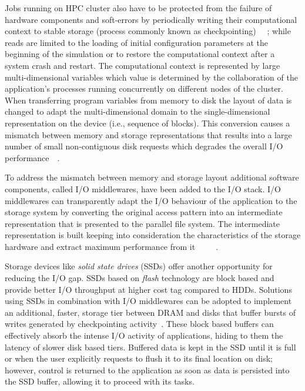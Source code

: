 Jobs running on HPC cluster also have to be protected from the failure of hardware components and soft-errors by periodically writing their computational context to stable storage (process commonly known as checkpointing)
~\cite{Schroeder2006}~\cite{Schroeder2007}; 
while reads are limited to the loading of initial configuration parameters at the beginning of the simulation or to restore the computational context after a system crash and restart. The computational context is 
represented by large multi-dimensional variables which value is determined by the collaboration of the application's processes running concurrently on different nodes of the cluster. When transferring program 
variables from memory to disk the layout of data is changed to adapt the multi-dimensional domain to the single-dimensional representation on the device (i.e., sequence of blocks). This conversion causes a mismatch 
between memory and storage representations that results into a large number of small non-contiguous disk requests which degrades the overall I/O performance~\cite{Nieuwejaar1996}~\cite{Simitci1998}. 

To address the mismatch between memory and storage layout additional software components, called I/O middlewares, have been added to the I/O stack. I/O middlewares can transparently adapt the I/O behaviour of the 
application to the storage system by converting the original access pattern into an intermediate representation that is presented to the parallel file system. The intermediate representation is built keeping into 
consideration the characteristics of the storage hardware and extract maximum performance from it~\cite{ThakurC96}~\cite{Bent2009}~\cite{Moody2010_2}~\cite{Frings2009}~\cite{Lofstead2008}.

Storage devices like \textit{solid state drives} (SSDs) offer another opportunity for reducing the I/O gap. SSDs based on \textit{flash} technology are block based and provide better I/O throughput at higher cost
tag compared to HDDs. Solutions using SSDs in combination with I/O middlewares can be adopted to implement an additional, faster, storage tier between DRAM and disks that buffer bursts of writes generated by
checkpointing activity~\cite{Liu2012}. These block based buffers can effectively absorb the intense I/O activity of applications, hiding to them the latency of slower disk based tiers. Buffered data is kept in the SSD until
it is full or when the user explicitly requests to flush it to its final location on disk; however, control is returned to the application as soon as data is persisted into the SSD buffer, allowing it to proceed 
with its tasks. 

